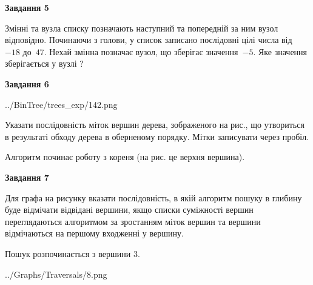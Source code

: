 \documentclass[12pt, ukrainian]{article}
\begin{document}
{\begin {large}
{\begin {center}\textbf{Завдання 5}\end {center}}\par
Змінні  та  вузла списку позначають наступний та попередній за ним вузол відповідно. Починаючи з голови, у список записано послідовні цілі числа від~$-18$ до~$47$. Нехай змінна  позначає вузол, що зберігає значення~$-5$.
Яке значення зберігається у вузлі  ?\par
\newpage

{\begin {center}\textbf{Завдання 6}\end {center}}\par

\begin{center}
	{../BinTree/trees_exp/142.png}
\end{center}
Указати послідовність міток вершин дерева, зображеного на рис., що утвориться в результаті обходу дерева в оберненому порядку. Мітки записувати через пробіл.\par Алгоритм починає роботу з кореня (на рис. це верхня вершина).\par
\newpage

{\begin {center}\textbf{Завдання 7}\end {center}}\par
Для графа на рисунку вказати послідовність, в якій алгоритм пошуку в глибину буде відмічати відвідані вершини, якщо списки суміжності вершин переглядаються алгоритмом за зростанням міток вершин та вершини відмічаються на першому вход\-женні у вершину.\par
Пошук розпочинається з вершини 3.\par

\begin{center}
	{../Graphs/Traversals/8.png}
\end{center}\par
\newpage


\end{large}}
\end{document}

